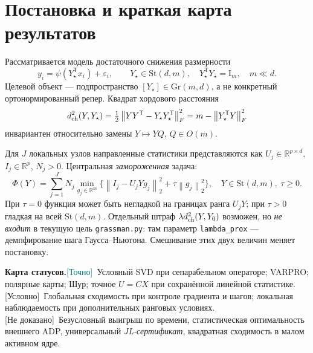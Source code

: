 \documentclass[10.5pt,a4paper]{article}
\newcommand{\R}{\mathbb{R}}
\newcommand{\St}{\mathrm{St}}
\newcommand{\Gr}{\mathrm{Gr}}
\newcommand{\I}{\mathrm{I}}
\newcommand{\T}{^{\mathsf T}}
\newcommand{\norm}[1]{\left\|#1\right\|}
\numberwithin{equation}{section}
\theoremstyle{plain}
\theoremstyle{definition}
\newcommand{\verified}{\textcolor{teal}{\textsf{[Точно]}}}
\newcommand{\conditional}{\textcolor{amber}{\textsf{[Условно]}}}
\newcommand{\unproved}{\textcolor{amber}{\textsf{[Не доказано]}}}
\begin{document}
\section{Постановка и краткая карта результатов}
Рассматривается модель достаточного снижения размерности
\begin{equation}
 y_i=\psi(Y_\star\T x_i)+\varepsilon_i,\qquad
 Y_\star\in\St(d,m),\quad Y_\star\T Y_\star=\I_m,\quad m\ll d.
 \label{eq:model}
\end{equation}
Целевой объект --- подпространство $[Y_\star]\in\Gr(m,d)$, а не конкретный ортонормированный репер. Квадрат хордового расстояния
\begin{equation}
 d_{\rm ch}^2(Y,Y_\star)=\tfrac12\norm{YY\T-Y_\star Y_\star\T}_F^2
 =m-\norm{Y_\star\T Y}_F^2
 \label{eq:chord}
\end{equation}
инвариантен относительно замены $Y\mapsto YQ$, $Q\in O(m)$.

Для $J$ локальных узлов направленные статистики представляются как $U_j\in\R^{p\times d}$, $I_j\in\R^p$, $N_j>0$. Центральная \emph{замороженная} задача:
\begin{equation}
 \Phi(Y)=\sum_{j=1}^J N_j\min_{g_j\in\R^m}
 \bigl\{\norm{I_j-U_jYg_j}_2^2+\tau\norm{g_j}_2^2\bigr\},
 \quad Y\in\St(d,m),\ \tau\ge0.
 \label{eq:varpro}
\end{equation}
При $\tau=0$ функция может быть негладкой на границах ранга $U_jY$; при $\tau>0$ гладкая на всей $\St(d,m)$. Отдельный штраф $\lambda d_{\rm ch}^2(Y,Y_0)$ возможен, но \emph{не входит} в текущую цель \texttt{grassman.py}: там параметр \texttt{lambda\_prox} --- демпфирование шага Гаусса--Ньютона. Смешивание этих двух величин меняет постановку.

\begin{mainbox}
\textbf{Карта статусов.}\quad \verified\ Условный SVD при сепарабельном операторе; VARPRO; полярные карты; Шур; точное $U=CX$ при сохранённой линейной статистике.\\[2pt]
\conditional\ Глобальная сходимость при контроле градиента и шагов; локальная наблюдаемость при дополнительных ранговых условиях.\\[2pt]
\unproved\ Безусловный выигрыш по времени, статистическая оптимальность внешнего ADP, универсальный \emph{JL-сертификат}, квадратная сходимость в малом активном ядре.
\end{mainbox}
\end{document}
